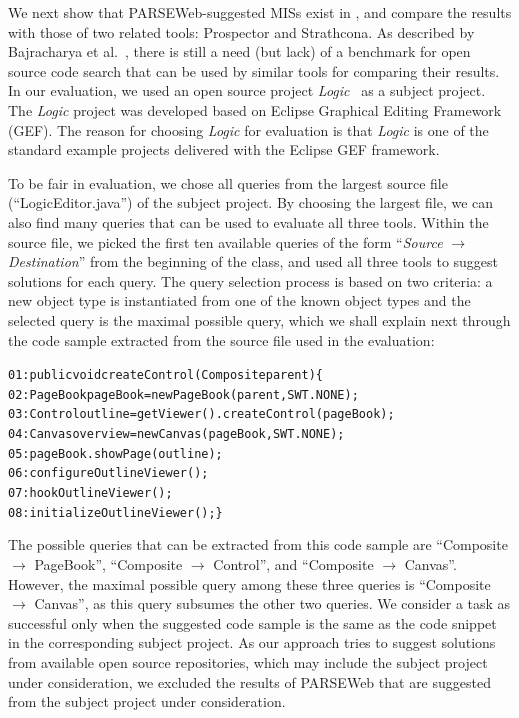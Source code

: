 We next show that PARSEWeb-suggested MISs exist in \realprojects{},
and compare the results with those of two related tools: Prospector
and Strathcona. As described by Bajracharya et
al.~\cite{sourcerer:baj}, there is still a need (but lack) of a
benchmark for open source code search that can be used by similar
tools for comparing their results. In our evaluation, we used an
open source project \emph{Logic}~\cite{Logic} as a subject project.
The \emph{Logic} project was developed based on Eclipse Graphical
Editing Framework (GEF). The reason for choosing \emph{Logic} for
evaluation is that \emph{Logic} is one of the standard example
projects delivered with the Eclipse GEF framework.

To be fair in evaluation, we chose all queries from the largest
source file (``LogicEditor.java'') of the subject project. 
By choosing the largest file, we can also find many
queries that can be used to evaluate all three tools. Within the
source file, we picked the first ten available queries of the form
``\emph{Source} $\rightarrow$ \emph{Destination}'' from the
beginning of the class, and used all three tools to suggest
solutions for each query. The query selection process is based on
two criteria: a new object type is instantiated from one of the
known object types and the selected query is the maximal possible
query, which we shall explain next through the code sample
extracted from the source file used in the evaluation:

\begin{CodeOut}
\begin{alltt}
01:public void createControl(Composite parent)\{
02:\hspace*{0.1in}PageBook pageBook = new PageBook(parent, SWT.NONE);
03:\hspace*{0.1in}Control outline = getViewer().createControl(pageBook);
04:\hspace*{0.1in}Canvas overview = new Canvas(pageBook, SWT.NONE);
05:\hspace*{0.1in}pageBook.showPage(outline);
06:\hspace*{0.1in}configureOutlineViewer();
07:\hspace*{0.1in}hookOutlineViewer();
08:\hspace*{0.1in}initializeOutlineViewer();\}
\end{alltt}
\end{CodeOut}

The possible queries that can be extracted from this code sample are
``Composite $\rightarrow$ PageBook'', ``Composite $\rightarrow$
Control'', and ``Composite $\rightarrow$ Canvas''. However, the
maximal possible query among these three queries is ``Composite
$\rightarrow$ Canvas'', as this query subsumes the other two
queries. We consider a task as successful only when the suggested
code sample is the same as the code snippet in the corresponding
subject project. As our approach tries to suggest solutions from
available open source repositories, which may include the subject
project under consideration, we excluded the results of PARSEWeb
that are suggested from the subject project under consideration.

